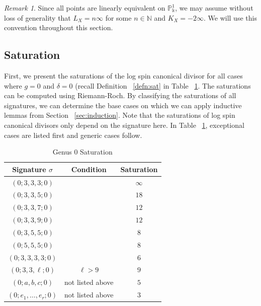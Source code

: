 \documentclass{amsart}
\theoremstyle{plain}
\theoremstyle{definition}
\theoremstyle{remark}
\newtheorem{rem}[thm]{Remark}
\numberwithin{equation}{section}
\newcommand\ssec{\subsection}
\newcommand\BN{{\mathbb N}}
\newcommand\BP{{\mathbb P}}
\newcommand\Bk{{\Bbbk}}
\newcommand{\halfcan}{L}
\begin{document}
\begin{rem}
Since all points are linearly equivalent on $\BP^1_\Bk$, we may
assume without loss of generality that $\halfcan_X = n \infty$ for some $n
\in \BN$ and $K_X = -2 \infty$. We will use this convention
throughout this section.
\end{rem}

\ssec{Saturation}
\label{ssec:g-0-saturation}
First, we present the saturations of the log spin canonical divisor
for all cases where $g = 0$ and $\delta = 0$ (recall Definition
~\ref{defn:sat} in Table ~\ref{table:g-0-sat}. The saturations can
be computed using Riemann-Roch. By classifying the saturations of
all signatures, we can determine the base cases on which we can
apply inductive lemmas from Section ~\ref{sec:induction}. Note that
the saturations of log spin canonical divisors only depend on the
signature here. In Table ~\ref{table:g-0-sat}, exceptional cases
are listed first and generic cases follow.

\begin{table}
\begin{tabular}
	{| c | c || c |}
	\hline
	Signature $\sigma$ & Condition & Saturation \\
	\hline
	\hline

	$(0; 3, 3, 3; 0)$ & & $\infty$ \\	\hline

	$(0; 3, 3, 5; 0)$ & & $18$ \\	\hline
	
	$(0; 3, 3, 7; 0)$ & & $12$ \\	\hline
	
	$(0; 3, 3, 9; 0)$ & & $12$ \\	\hline
	
	$(0; 3, 5, 5; 0)$ & & $8$ \\	\hline
	
	$(0; 5, 5, 5; 0)$ & & $8$ \\	\hline
	
	$(0; 3, 3, 3, 3; 0)$ & & $6$ \\	\hline
	
	\hline
	\hline
	
	$(0; 3, 3, \ell; 0)$ & $\ell > 9$ & $9$ \\	\hline
	
	$(0; a, b, c; 0)$ & not listed above & $5$ \\	\hline
	
	$(0; e_1, \ldots, e_r; 0)$ & not listed above & $3$ \\	\hline
\end{tabular}

\caption{Genus 0 Saturation}
\label{table:g-0-sat}
\end{table}
\end{document}

